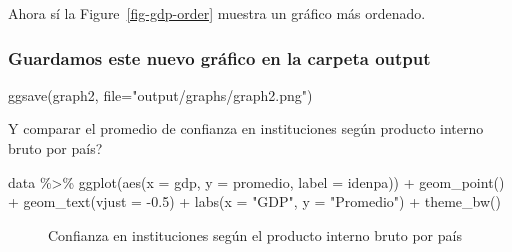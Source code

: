 \documentclass[
  letterpaper,
  DIV=11,
  numbers=noendperiod]{scrartcl}
\newenvironment{Shaded}{\begin{snugshade}}{\end{snugshade}}
\newcommand{\AttributeTok}[1]{\textcolor[rgb]{0.40,0.45,0.13}{#1}}
\newcommand{\FloatTok}[1]{\textcolor[rgb]{0.68,0.00,0.00}{#1}}
\newcommand{\FunctionTok}[1]{\textcolor[rgb]{0.28,0.35,0.67}{#1}}
\newcommand{\NormalTok}[1]{\textcolor[rgb]{0.00,0.23,0.31}{#1}}
\newcommand{\SpecialCharTok}[1]{\textcolor[rgb]{0.37,0.37,0.37}{#1}}
\newcommand{\StringTok}[1]{\textcolor[rgb]{0.13,0.47,0.30}{#1}}
\begin{document}
Ahora sí la Figure~\ref{fig-gdp-order} muestra un gráfico más ordenado.

\subsubsection{Guardamos este nuevo gráfico en la carpeta
output}\label{guardamos-este-nuevo-gruxe1fico-en-la-carpeta-output}

\begin{Shaded}
\begin{Highlighting}[]
\FunctionTok{ggsave}\NormalTok{(graph2, }\AttributeTok{file=}\StringTok{"output/graphs/graph2.png"}\NormalTok{)}
\end{Highlighting}
\end{Shaded}

Y comparar el promedio de confianza en instituciones según producto
interno bruto por país?

\begin{Shaded}
\begin{Highlighting}[]
\NormalTok{data }\SpecialCharTok{\%\textgreater{}\%}
  \FunctionTok{ggplot}\NormalTok{(}\FunctionTok{aes}\NormalTok{(}\AttributeTok{x =}\NormalTok{ gdp, }\AttributeTok{y =}\NormalTok{ promedio, }\AttributeTok{label =}\NormalTok{ idenpa)) }\SpecialCharTok{+}
  \FunctionTok{geom\_point}\NormalTok{() }\SpecialCharTok{+}
  \FunctionTok{geom\_text}\NormalTok{(}\AttributeTok{vjust =} \SpecialCharTok{{-}}\FloatTok{0.5}\NormalTok{) }\SpecialCharTok{+}
  \FunctionTok{labs}\NormalTok{(}\AttributeTok{x =} \StringTok{"GDP"}\NormalTok{, }\AttributeTok{y =} \StringTok{"Promedio"}\NormalTok{) }\SpecialCharTok{+}
  \FunctionTok{theme\_bw}\NormalTok{()}
\end{Highlighting}
\end{Shaded}

\begin{figure}[H]


\caption{\label{fig-ctr}Confianza en instituciones según el producto
interno bruto por país}

\end{figure}%
\end{document}
